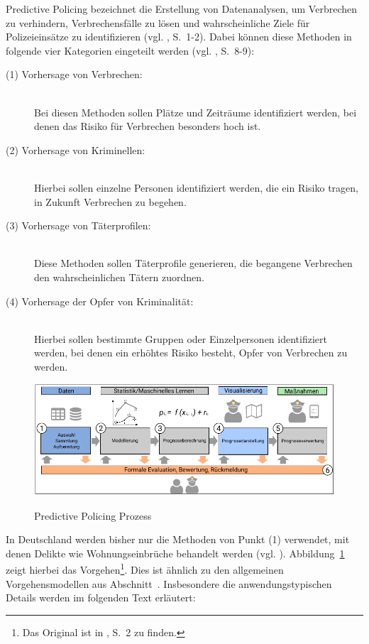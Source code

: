 Predictive Policing bezeichnet die Erstellung von Datenanalysen, um Verbrechen zu verhindern, Verbrechensfälle zu lösen
und wahrscheinliche Ziele für Polizeieinsätze zu identifizieren (vgl. \cite{Perry}, S.~1-2). Dabei können diese Methoden
in folgende vier Kategorien eingeteilt werden (vgl. \cite{Perry}, S.~8-9):

\begin{description}

\item[(1) Vorhersage von Verbrechen:] \hfill \\
Bei diesen Methoden sollen Plätze und Zeiträume identifiziert werden,
bei denen das Risiko für Verbrechen besonders hoch ist.

\item[(2) Vorhersage von Kriminellen:] \hfill \\
Hierbei sollen einzelne Personen identifiziert werden, die ein Risiko
tragen, in Zukunft Verbrechen zu begehen.

\item[(3) Vorhersage von Täterprofilen:] \hfill \\
Diese Methoden sollen Täterprofile generieren, die begangene Verbrechen
den wahrscheinlichen Tätern zuordnen.

\item[(4) Vorhersage der Opfer von Kriminalität:] \hfill \\
Hierbei sollen bestimmte Gruppen oder Einzelpersonen identifiziert werden,
bei denen ein erhöhtes Risiko besteht, Opfer von Verbrechen zu werden.

\end{description} 

\begin{figure}%
\centering
\caption{Predictive Policing Prozess}
\includegraphics[scale=1.1]{Grafiken/Predictive_Policing_Ink.pdf} 
\label{pic:Predictive_Policing}
\end{figure}

In Deutschland werden bisher nur die Methoden von Punkt (1) verwendet, mit denen
Delikte wie Wohnungseinbrüche behandelt werden (vgl. \cite{Heuberger}).
Abbildung~\ref{pic:Predictive_Policing} zeigt hierbei das Vorgehen\footnote{
Das Original ist in \cite{Bode}, S.~2 zu finden.
}. Dies ist ähnlich zu den
allgemeinen Vorgehensmodellen aus Abschnitt~\xcom. Insbesondere die anwendungstypischen Details werden
im folgenden Text erläutert:

